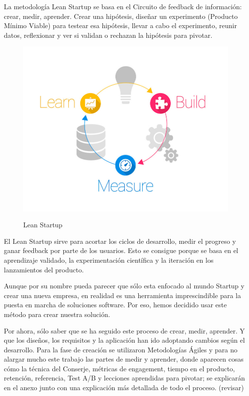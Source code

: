 \documentclass[12pt,twoside,titlepage]{report}
\begin{document}
La metodología Lean Startup se basa en el Circuito de feedback de información: crear, medir, aprender. Crear una hipótesis, diseñar un experimento (Producto Mínimo Viable) para testear esa hipótesis, llevar a cabo el experimento, reunir datos, reflexionar y ver si validan o rechazan la hipótesis para pivotar.

\begin{figure}[H]
    \centering
    \includegraphics[scale=0.3]{Lean Startup/CircuitoFeedback}
    \label{fig:LeanStartup}
    \caption{Lean Startup}
\end{figure}

El Lean Startup sirve para acortar los ciclos de desarrollo, medir el progreso y ganar feedback por parte de los usuarios. Esto se consigue porque se basa en el aprendizaje validado, la experimentación científica y la iteración en los lanzamientos del producto. 

Aunque por su nombre pueda parecer que sólo esta enfocado al mundo Startup y crear una nueva empresa, en realidad es una herramienta imprescindible para la puesta en marcha de soluciones software. Por eso, hemos decidido usar este método para crear nuestra solución.

Por ahora, sólo saber que se ha seguido este proceso de crear, medir, aprender. Y que los diseños, los requisitos y la aplicación han ido adoptando cambios según el desarrollo. Para la fase de creación se utilizaron Metodologías Ágiles y para no alargar mucho este trabajo las partes de medir y aprender, donde aparecen cosas cómo la técnica del Conserje, métricas de engagement, tiempo en el producto, retención, referencia, Test A/B y lecciones aprendidas para pivotar; se explicarán en el anexo junto con una explicación más detallada de todo el proceso. 
(revisar)
\end{document}
